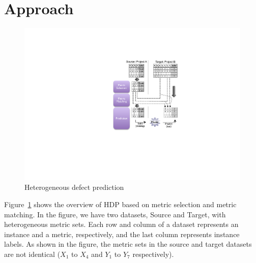 \section{Approach}
\label{sec:Approach}

\begin{figure}[t]
	\centering
	\includegraphics[width=0.925\linewidth]{Figures/framework.pdf}
	\caption{Heterogeneous defect prediction}
	\label{fig:framework}
\end{figure}

Figure~\ref{fig:framework} shows the overview of HDP based on metric selection
and metric matching. In the figure, we have two datasets, Source and Target,
with heterogeneous metric sets. Each row and column of a dataset represents an
instance and a metric, respectively, and the last column represents instance
labels. As shown in the figure, the metric sets in the source and target datasets are not identical ($X_1$ to $X_4$ and $Y_1$ to
$Y_7$ respectively).

